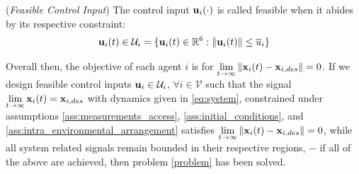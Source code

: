 \begin{bw_box}
  \begin{definition} (\textit{Feasible Control Input})
    \label{definition:feasible_control_input}
    The control input $\bm{\mathbf{u}}_i (\cdot)$ is called feasible when it abides
    by its respective constraint:
  \begin{align}
    \bm{\mathbf{u}}_i(t) \in \mathcal{U}_i = \{ \bm{\mathbf{u}}_i(t) \in \mathbb{R}^6 : \|\bm{\mathbf{u}}_i (t)\| \leq \overline{u}_i\}
  \end{align}

\end{definition}
\end{bw_box}

Overall then, the objective of each agent $i$ is for
$\lim\limits_{t \to \infty} \|\bm{\mathbf{x}}_i(t) - \bm{\mathbf{x}}_{i,des}\| = 0$.
If we design feasible control inputs $\bm{\mathbf{u}}_i \in \mathcal{U}_i$,
$\forall i \in \mathcal{V}$ such that the signal
$\lim\limits_{t \to \infty} \bm{\mathbf{x}}_i(t) = \bm{\mathbf{x}}_{i,des}$ with
dynamics given in \eqref{eq:system}, constrained under
assumptions \eqref{ass:measurements_access}, \eqref{ass:initial_conditions},
and \eqref{ass:intra_environmental_arrangement} satisfies
$\lim\limits_{t \to \infty} \|\bm{\mathbf{x}}_i(t) - \bm{\mathbf{x}}_{i,des}\| = 0$,
while all system related signals remain bounded in their respective regions,
$-$ if all of the above are achieved, then problem \eqref{problem} has been
solved.
